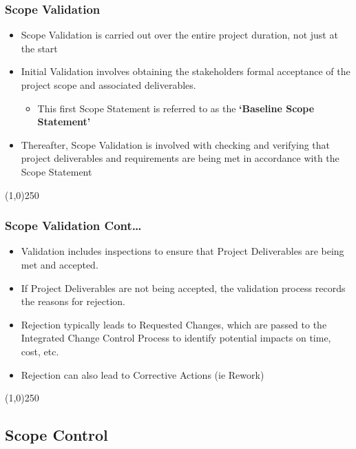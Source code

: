 \begin{frame}
\frametitle{Scope Validation}
\begin{itemize}
	\item Scope Validation is carried out over the entire project duration, not just at the start
	\item Initial Validation involves obtaining the stakeholders formal acceptance of the project scope and associated deliverables.
	\begin{itemize}
		\item This first Scope Statement is referred to as the \textbf{`Baseline Scope Statement'}
	\end{itemize}
	\item Thereafter, Scope Validation is involved with checking and verifying that project deliverables and requirements are being met in accordance with the Scope Statement
\end{itemize}
\end{frame}\begin{center}\line(1,0){250}\end{center}



\begin{frame}
\frametitle{Scope Validation \hfill Cont\ldots}
\begin{itemize}
	\item Validation includes inspections to ensure that Project Deliverables are being met and accepted.
	\item If Project Deliverables are not being accepted, the validation process records the reasons for rejection.
	\item Rejection typically leads to Requested Changes, which are passed to the Integrated Change Control Process to identify potential impacts on time, cost, etc.
	\item Rejection can also lead to Corrective Actions (ie Rework)
\end{itemize}
\end{frame}\begin{center}\line(1,0){250}\end{center}

\subsection{Scope Control}

